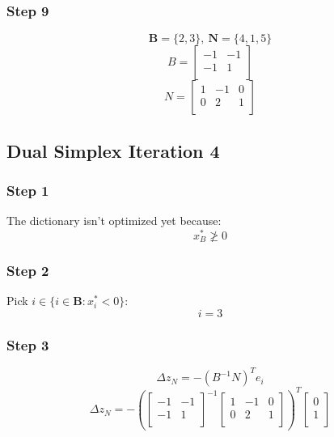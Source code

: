 \documentclass[14pt]{extarticle}
\begin{document}
\subsubsection*{Step 9}
\[
    \boldsymbol{B} = \{2, 3\},\ \boldsymbol{N} = \{4, 1, 5\}
\]
\[
    B = \begin{bmatrix}
        -1 & -1 \\
        -1 & 1 \\
    \end{bmatrix}
\]
\[
    N = \begin{bmatrix}
        1 & -1 & 0 \\
        0 & 2 & 1 \\
    \end{bmatrix}
\]

\subsection*{Dual Simplex Iteration 4}
\subsubsection*{Step 1}
The dictionary isn't optimized yet because:
\[
    x^*_B \ngeq 0
\]

\subsubsection*{Step 2}
Pick $i \in \{i \in \boldsymbol{B}: x^*_i < 0\}$:
\[
    i = 3
\]

\subsubsection*{Step 3}
\[
    \Delta z_N = -(B^{-1}N)^T e_i
\]
\[
    \Delta z_N = -\left(\begin{bmatrix}
        -1 & -1 \\
        -1 & 1 \\
    \end{bmatrix}^{-1}
    \begin{bmatrix}
        1 & -1 & 0 \\
        0 & 2 & 1 \\
    \end{bmatrix}\right)^T
    \begin{bmatrix}
        0 \\
        1 \\
    \end{bmatrix}
\]
\end{document}
